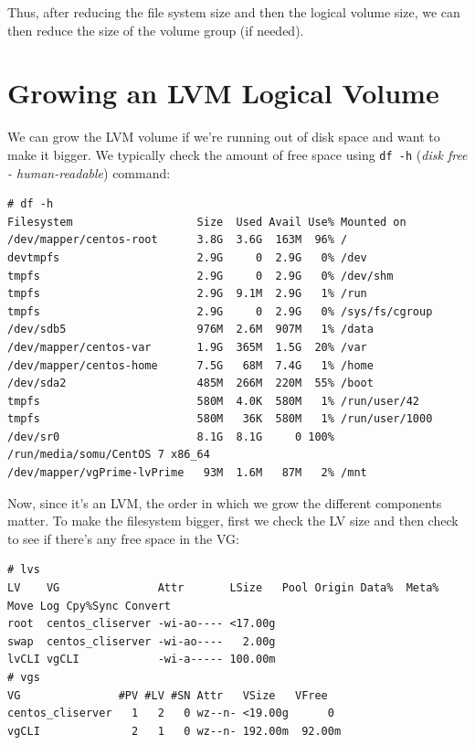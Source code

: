 Thus, after reducing the file system size and then the logical volume size, we can then reduce the size of the volume group (if needed). 

\section{Growing an LVM Logical Volume}
We can grow the LVM volume if we're running out of disk space and want to make it bigger. We typically check the amount of free space using \verb|df -h| (\textit{disk free - human-readable}) command:

\vspace{-15pt}
\begin{verbatim}
# df -h
Filesystem                   Size  Used Avail Use% Mounted on
/dev/mapper/centos-root      3.8G  3.6G  163M  96% /
devtmpfs                     2.9G     0  2.9G   0% /dev
tmpfs                        2.9G     0  2.9G   0% /dev/shm
tmpfs                        2.9G  9.1M  2.9G   1% /run
tmpfs                        2.9G     0  2.9G   0% /sys/fs/cgroup
/dev/sdb5                    976M  2.6M  907M   1% /data
/dev/mapper/centos-var       1.9G  365M  1.5G  20% /var
/dev/mapper/centos-home      7.5G   68M  7.4G   1% /home
/dev/sda2                    485M  266M  220M  55% /boot
tmpfs                        580M  4.0K  580M   1% /run/user/42
tmpfs                        580M   36K  580M   1% /run/user/1000
/dev/sr0                     8.1G  8.1G     0 100% /run/media/somu/CentOS 7 x86_64
/dev/mapper/vgPrime-lvPrime   93M  1.6M   87M   2% /mnt
\end{verbatim}
\vspace{-10pt}

\noindent
Now, since it's an LVM, the order in which we grow the different components matter. To make the filesystem bigger, first we check the LV size and then check to see if there's any free space in the VG:

\vspace{-15pt}
\begin{verbatim}
# lvs
LV    VG               Attr       LSize   Pool Origin Data%  Meta%  Move Log Cpy%Sync Convert
root  centos_cliserver -wi-ao---- <17.00g                                                    
swap  centos_cliserver -wi-ao----   2.00g                                                    
lvCLI vgCLI            -wi-a----- 100.00m                                                    
# vgs
VG               #PV #LV #SN Attr   VSize   VFree  
centos_cliserver   1   2   0 wz--n- <19.00g      0 
vgCLI              2   1   0 wz--n- 192.00m  92.00m
\end{verbatim}
\vspace{-10pt}

